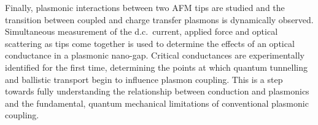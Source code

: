 \documentclass[12pt, a4paper, oneside]{book}
\begin{document}
Finally, plasmonic interactions between two AFM tips are studied and the transition between coupled and charge transfer plasmons is dynamically observed. Simultaneous measurement of the d.c.\ current, applied force and optical scattering as tips come together is used to determine the effects of an optical conductance in a plasmonic nano-gap. Critical conductances are experimentally identified for the first time, determining the points at which quantum tunnelling and ballistic transport begin to influence plasmon coupling. This is a step towards fully understanding the relationship between conduction and plasmonics and the fundamental, quantum mechanical limitations of conventional plasmonic coupling.
\end{document}

